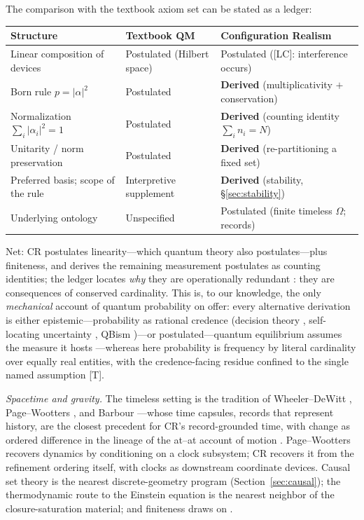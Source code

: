 \documentclass[11pt]{article}
\theoremstyle{definition}
\theoremstyle{remark}
\begin{document}
The comparison with the textbook axiom set can be stated as a ledger:
\begin{center}\footnotesize
\begin{tabular}{@{}lll@{}}
\toprule
Structure & Textbook QM & Configuration Realism\\
\midrule
Linear composition of devices & Postulated (Hilbert space) & Postulated ([LC]: interference occurs)\\
Born rule $p=|\alpha|^2$ & Postulated & \textbf{Derived} (multiplicativity $+$ conservation)\\
Normalization $\sum_i|\alpha_i|^2=1$ & Postulated & \textbf{Derived} (counting identity $\sum_i n_i=N$)\\
Unitarity / norm preservation & Postulated & \textbf{Derived} (re-partitioning a fixed set)\\
Preferred basis; scope of the rule & Interpretive supplement & \textbf{Derived} (stability, \S\ref{sec:stability})\\
Underlying ontology & Unspecified & Postulated (finite timeless $\Omega$; records)\\
\bottomrule
\end{tabular}
\end{center}
\noindent Net: CR postulates linearity---which quantum theory also postulates---plus finiteness, and derives the remaining measurement postulates as counting identities; the ledger locates \emph{why} they are operationally redundant \cite{MGM2019}: they are consequences of conserved cardinality. This is, to our knowledge, the only \emph{mechanical} account of quantum probability on offer: every alternative derivation is either epistemic---probability as rational credence (decision theory \cite{Deutsch1999,Wallace2007}, self-locating uncertainty \cite{SebensCarroll2018}, QBism \cite{Fuchs2014})---or postulated---quantum equilibrium assumes the measure it hosts \cite{Durr1992}---whereas here probability is frequency by literal cardinality over equally real entities, with the credence-facing residue confined to the single named assumption [T].

\emph{Spacetime and gravity.} The timeless setting is the tradition of Wheeler--DeWitt \cite{DeWitt1967}, Page--Wootters \cite{PageWootters1983}, and Barbour \cite{Barbour1999}---whose time capsules, records that represent history, are the closest precedent for CR's record-grounded time, with change as ordered difference in the lineage of the at--at account of motion \cite{Russell1903}. Page--Wootters recovers dynamics by conditioning on a clock subsystem; CR recovers it from the refinement ordering itself, with clocks as downstream coordinate devices. Causal set theory \cite{BLMS1987,Malament1977,HKM1976} is the nearest discrete-geometry program (Section~\ref{sec:causal}); the thermodynamic route to the Einstein equation \cite{Jacobson1995,Verlinde2011,VanRaamsdonk2010} is the nearest neighbor of the closure-saturation material; and finiteness draws on \cite{Bekenstein1981,Banks2001,CarrollSingh2018}.
\end{document}
